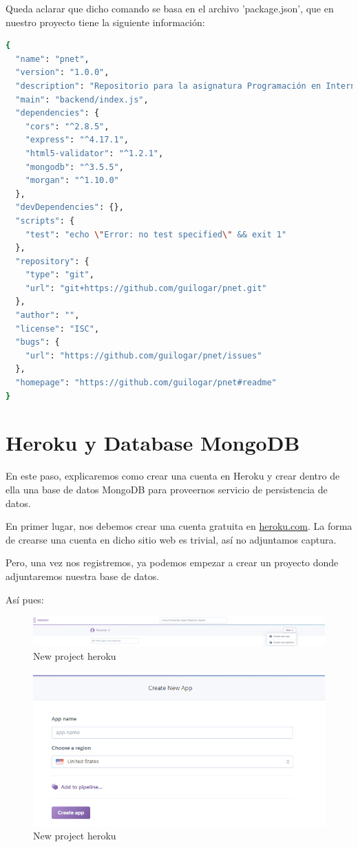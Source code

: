 \documentclass{article}
\begin{document}
Queda aclarar que dicho comando se basa en el archivo 'package.json', que en nuestro proyecto tiene la siguiente información:

\begin{lstlisting}[language=bash]
{
  "name": "pnet",
  "version": "1.0.0",
  "description": "Repositorio para la asignatura Programación en Internet",
  "main": "backend/index.js",
  "dependencies": {
    "cors": "^2.8.5",
    "express": "^4.17.1",
    "html5-validator": "^1.2.1",
    "mongodb": "^3.5.5",
    "morgan": "^1.10.0"
  },
  "devDependencies": {},
  "scripts": {
    "test": "echo \"Error: no test specified\" && exit 1"
  },
  "repository": {
    "type": "git",
    "url": "git+https://github.com/guilogar/pnet.git"
  },
  "author": "",
  "license": "ISC",
  "bugs": {
    "url": "https://github.com/guilogar/pnet/issues"
  },
  "homepage": "https://github.com/guilogar/pnet#readme"
}
\end{lstlisting}

\section{Heroku y Database MongoDB}
En este paso, explicaremos como crear una cuenta en Heroku y crear dentro de ella una base de datos MongoDB para proveernos servicio de persistencia de datos.

En primer lugar, nos debemos crear una cuenta gratuita en \url{heroku.com}. La forma de crearse una cuenta en dicho sitio web es trivial, así no adjuntamos captura.

Pero, una vez nos registremos, ya podemos empezar a crear un proyecto donde adjuntaremos nuestra base de datos.

Así pues:

\begin{figure}[H]
\centering
\includegraphics[width=\textwidth]{heroku/new_project1}
\caption{New project heroku}
\label{fig:universe}
\end{figure}

\begin{figure}[H]
\centering
\includegraphics[width=\textwidth]{heroku/new_project2}
\caption{New project heroku}
\label{fig:universe}
\end{figure}
\end{document}
